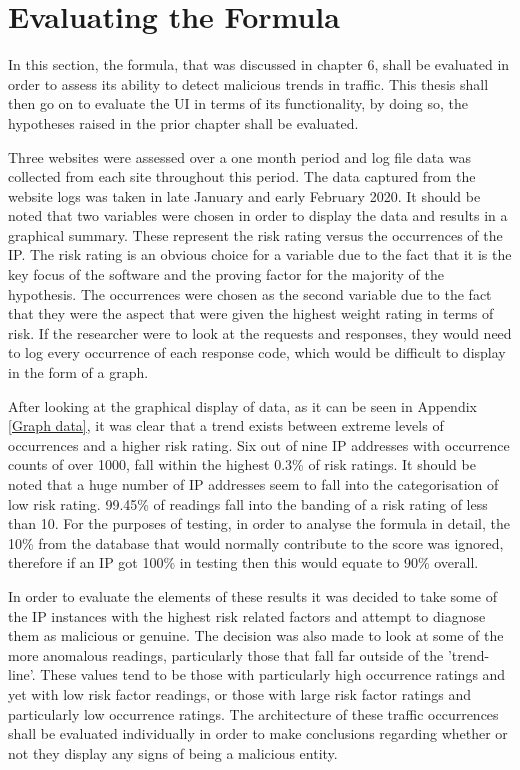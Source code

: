 \section{Evaluating the Formula}
In this section, the formula, that was discussed in chapter 6, shall be evaluated in order to assess its ability to detect malicious trends in traffic. This thesis shall then go on to evaluate the UI in terms of its functionality, by doing so, the hypotheses raised in the prior chapter shall be evaluated.

Three websites were assessed over a one month period and log file data was collected from each site throughout this period. The data captured from the website logs was taken in late January and early February 2020. It should be noted that two variables were chosen in order to display the data and results in a graphical summary. These represent the risk rating versus the occurrences of the IP. The risk rating is an obvious choice for a variable due to the fact that it is the key focus of the software and the proving factor for the majority of the hypothesis. The occurrences were chosen as the second variable due to the fact that they were the aspect that were given the highest weight rating in terms of risk. If the researcher were to look at the requests and responses, they would need to log every occurrence of each response code, which would be difficult to display in the form of a graph.



After looking at the graphical display of data, as it can be seen in Appendix 
\ref{Graph data}, it was clear that a trend exists between extreme levels of occurrences and a higher risk rating. Six out of nine IP addresses with occurrence counts of over 1000, fall within the highest 0.3\% of risk ratings. It should be noted that a huge number of IP addresses seem to fall into the categorisation of low risk rating. 99.45\% of readings fall into the banding of a risk rating of less than 10. For the purposes of testing, in order to analyse the formula in detail, the 10\% from the database that would normally contribute to the score was ignored, therefore if an IP got 100\% in testing then this would equate to 90\% overall.

In order to evaluate the elements of these results it was decided to take some of the IP instances with the highest risk related factors and attempt to diagnose them as malicious or genuine. The decision was also made to look at some of the more anomalous readings, particularly those that fall far outside of the 'trend-line'. These values tend to be those with particularly high occurrence ratings and yet with low risk factor readings, or those with large risk factor ratings and particularly low occurrence ratings. The architecture of these traffic occurrences shall be evaluated individually in order to make conclusions regarding whether or not they display any signs of being a malicious entity.

